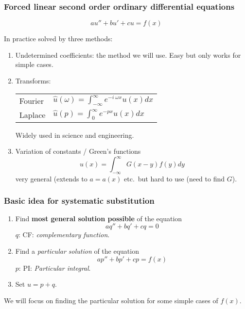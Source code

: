 \subsubsection*{Forced linear second order ordinary differential equations}

\[
au'' + bu' +cu  =  f(x)
\]

In  practice solved by three methods:
\begin{enumerate}
\item Undetermined coefficients: the method we will use.  Easy but only works for simple cases.

\item Transforms:\\
\begin{tabular}{ll}
Fourier & $\widehat{u}(\omega)  =  \displaystyle\int_{-\infty}^{\infty} e^{-i\
\omega x} u(x)dx$ \\
Laplace & $\widehat{u}(p)  =  \displaystyle\int_{0}^{\infty} e^{-px} u(x)dx$
\end{tabular}

Widely used in science and engineering.

\item Variation of constants / Green's functions
\[
u(x)  =  \int_{-\infty}^{\infty} G(x-y)f(y)d y
\]
very general (extends to $a=a(x)$ etc.\ but hard to use (need to find $G$).
\end{enumerate}


\subsubsection*{Basic idea for systematic substitution}
\begin{enumerate}
\item
Find \textbf{most general solution possible} of the equation
\[
aq'' + bq' + cq  =  0 
\]
$q$: CF: \emph{complementary function}.
\item
Find a \emph{particular solution} of the equation
\[
ap'' + bp' + cp  =  f(x)
\]
$p$: PI: \emph{Particular integral}.
\item
Set $u  =  p + q$.
\end{enumerate}

We will focus on finding the particular solution for some simple cases of $f(x)$.


